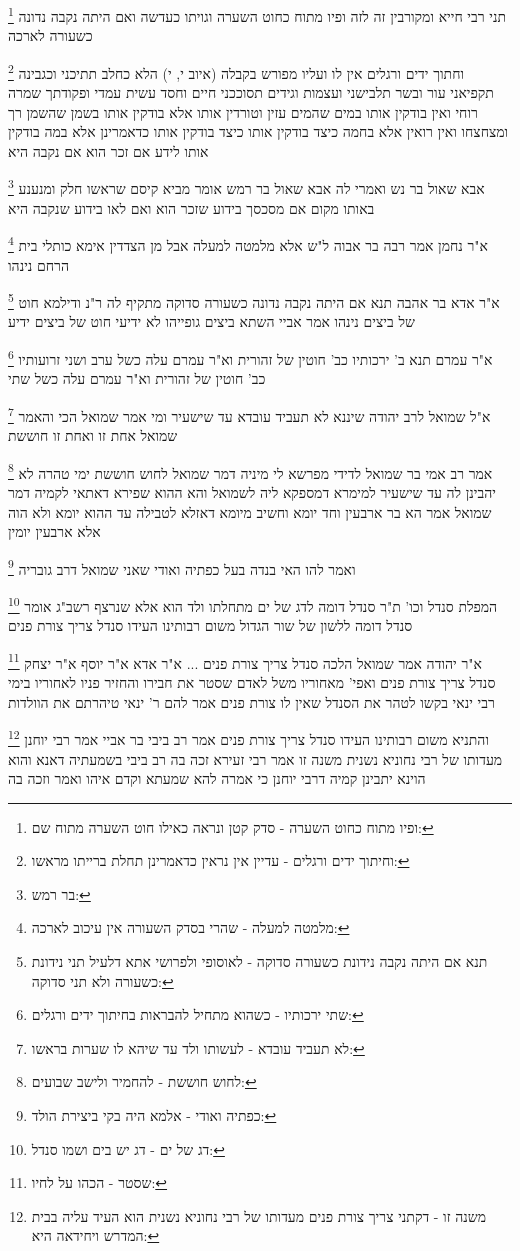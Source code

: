 \documentclass[12pt, openany]{book}
\newcommand{\footnotecomment}[1]{
	\renewcommand\thefootnote{}
	\footnote{#1}}
\newcommand{\commenta}[1]{\footnotecomment{#1}}
\begin{document}
{{\commenta{ופיו מתוח כחוט השערה - סדק קטן ונראה כאילו חוט השערה מתוח שם:}
תני רבי חייא ומקורבין זה לזה ופיו מתוח כחוט השערה וגויתו כעדשה ואם היתה נקבה נדונה כשעורה לארכה 
\commenta{וחיתוך ידים ורגלים - עדיין אין נראין כדאמרינן תחלת ברייתו מראשו:}
וחתוך ידים ורגלים אין לו ועליו מפורש בקבלה (איוב י, י) הלא כחלב תתיכני וכגבינה תקפיאני עור ובשר תלבישני ועצמות וגידים תסוככני חיים וחסד עשית עמדי ופקודתך שמרה רוחי 
ואין בודקין אותו במים שהמים עזין
וטורדין אותו אלא בודקין אותו בשמן שהשמן רך ומצחצחו ואין רואין אלא בחמה 
כיצד בודקין אותו כיצד בודקין אותו כדאמרינן אלא במה בודקין אותו לידע אם זכר הוא אם נקבה היא 
\commenta{בר רמש:}
אבא שאול בר נש ואמרי לה אבא שאול בר רמש אומר מביא קיסם שראשו חלק ומנענע באותו מקום אם מסכסך בידוע שזכר הוא ואם לאו בידוע שנקבה היא 
\commenta{מלמטה למעלה - שהרי בסדק השעורה אין עיכוב לארכה:}
א"ר נחמן אמר רבה בר אבוה ל"ש אלא מלמטה למעלה אבל מן הצדדין אימא כותלי בית הרחם נינהו 
\commenta{תנא אם היתה נקבה נידונת כשעורה סדוקה - לאוסופי ולפרושי אתא דלעיל תני נידונת כשעורה ולא תני סדוקה:}
א"ר אדא בר אהבה תנא אם היתה נקבה נדונה כשעורה סדוקה מתקיף לה ר"נ ודילמא חוט של ביצים נינהו אמר אביי השתא ביצים גופייהו לא ידיעי חוט של ביצים ידיע 
\commenta{שתי ירכותיו - כשהוא מתחיל להבראות בחיתוך ידים ורגלים:}
א"ר עמרם תנא ב' ירכותיו כב' חוטין של זהורית וא"ר עמרם עלה כשל ערב ושני זרועותיו כב' חוטין של זהורית וא"ר עמרם עלה כשל שתי 
\commenta{לא תעביד עובדא - לעשותו ולד עד שיהא לו שערות בראשו:}
א"ל שמואל לרב יהודה שיננא לא תעביד עובדא עד שישעיר ומי אמר שמואל הכי והאמר שמואל אחת זו ואחת זו חוששת 
\commenta{לחוש חוששת - להחמיר ולישב שבועים:}
אמר רב אמי בר שמואל לדידי מפרשא לי מיניה דמר שמואל לחוש חוששת ימי טהרה לא יהבינן לה עד שישעיר 
למימרא דמספקא ליה לשמואל והא ההוא שפירא דאתאי לקמיה דמר שמואל אמר הא בר ארבעין וחד יומא וחשיב מיומא דאזלא לטבילה עד ההוא יומא ולא הוה אלא ארבעין יומין
\commenta{כפתיה ואודי - אלמא היה בקי ביצירת הולד:}
ואמר להו האי בנדה בעל כפתיה ואודי שאני שמואל דרב גובריה
\commenta{דג של ים - דג יש בים ושמו סנדל:}
המפלת סנדל וכו' ת"ר סנדל דומה לדג של ים מתחלתו ולד הוא אלא שנרצף רשב"ג אומר סנדל דומה ללשון של שור הגדול משום רבותינו העידו סנדל צריך צורת פנים 
\commenta{שסטר - הכהו על לחיו:}
א"ר יהודה אמר שמואל הלכה סנדל צריך צורת פנים ... א"ר אדא א"ר יוסף א"ר יצחק סנדל צריך צורת פנים ואפי' מאחוריו משל לאדם שסטר את חבירו והחזיר פניו לאחוריו 
בימי רבי ינאי בקשו לטהר את הסנדל שאין לו צורת פנים אמר להם ר' ינאי טיהרתם את הוולדות 
\commenta{משנה זו - דקתני צריך צורת פנים מעדותו של רבי נחוניא נשנית הוא העיד עליה בבית המדרש ויחידאה היא:}
והתניא משום רבותינו העידו סנדל צריך צורת פנים אמר רב ביבי בר אביי אמר רבי יוחנן מעדותו של רבי נחוניא נשנית משנה זו אמר רבי זעירא זכה בה רב ביבי בשמעתיה דאנא והוא הוינא יתבינן קמיה דרבי יוחנן כי אמרה להא שמעתא וקדם איהו ואמר וזכה בה 
}}
\end{document}
